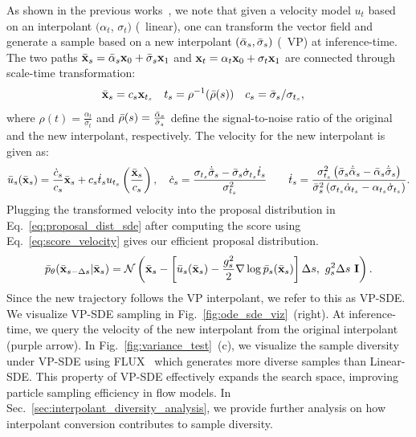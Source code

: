 As shown in the previous works~\cite{Lipman2024:flowguide, shaul2023bespoke}, we note that given a velocity model $u_t$ based on an interpolant $(\alpha_t$, $\sigma_t)$ (\eg~linear), one can transform the vector field and generate a sample based on a new interpolant $(\Bar{\alpha}_s, \Bar{\sigma}_s)$ (\eg~VP) at inference-time. 
The two paths $ \Bar{\mathbf{x}}_s = \Bar{\alpha}_s \mathbf{x}_0 + \Bar{\sigma}_s \mathbf{x}_1 $ and $ \mathbf{x}_t = \alpha_t \mathbf{x}_0 + \sigma_t \mathbf{x}_1 $ are connected through scale-time transformation:
\begin{align}
    \label{eq:scale_time_trans}
    \Bar{\mathbf{x}}_s &= c_s \mathbf{x}_{t_s} \quad t_s = \rho^{-1} (\Bar{\rho}(s)) \quad  c_s = \Bar{\sigma}_s / \sigma_{t_s},
\end{align}
where $\rho(t) = \frac{\alpha_t}{\sigma_t}$ and $\Bar{\rho}(s)=\frac{\Bar{\alpha}_s}{\Bar{\sigma}_s}$ define the signal-to-noise ratio of the original and the new interpolant, respectively. The velocity for the new interpolant is given as:
{\small
\begin{align}
    \label{eq:velocity_transform}
    \Bar{u}_s(\Bar{\mathbf{x}}_s) = \frac{\dot{c}_s}{c_s} \Bar{\mathbf{x}}_s & + c_s \dot{t}_s u_{t_s} \left(\frac{\Bar{\mathbf{x}}_{s}}{c_s} \right), \quad 
    \dot{c}_s = \frac{\sigma_{t_s} \dot{\Bar{\sigma}}_s - \Bar{\sigma}_s \dot{\sigma}_{t_s} \dot{t}_s}{\sigma_{t_s}^2} & 
    \quad \dot{t}_s = \frac{\sigma_{t_s}^2 \left( \Bar{\sigma}_s \dot{\Bar{\alpha}}_s - \Bar{\alpha}_s \dot{\Bar{\sigma}}_s \right)}{\Bar{\sigma}_s^2 \left( \sigma_{t_s} \dot{\alpha}_{t_s} - \alpha_{t_s} \dot{\sigma}_{t_s} \right)}.
\end{align}
}%
Plugging the transformed velocity into the proposal distribution in Eq.~\ref{eq:proposal_dist_sde} after computing the score using Eq.~\ref{eq:score_velocity} gives our efficient proposal distribution.
\begin{align}
    \label{eq:vp_sde_proposal}
    \Bar{p}_\theta(\Bar{\B{x}}_{s-\Delta s} | \Bar{\B{x}}_s) = \mathcal{N}\left(\Bar{\B{x}}_s - \left[ \Bar{u}_s(\Bar{\B{x}}_s) - \frac{g_s^2}{2} \nabla \log \Bar{p}_s(\Bar{\B{x}}_s) \right] \Delta s,\ 
     g_s^2 \Delta s\ \mathbf{I}\right).
\end{align}
Since the new trajectory follows the VP interpolant, we refer to this as VP-SDE. 
We visualize VP-SDE sampling in Fig.~\ref{fig:ode_sde_viz}~(right). At inference-time, we query the velocity of the new interpolant from the original interpolant (purple arrow). 
In Fig.~\ref{fig:variance_test}~(c), we visualize the sample diversity under VP-SDE using FLUX~\cite{BlackForestLabs:2024Flux} which generates more diverse samples than Linear-SDE. 
This property of VP-SDE effectively expands the search space, improving particle sampling efficiency in flow models. 
In Sec.~\ref{sec:interpolant_diversity_analysis}, we provide further analysis on how interpolant conversion contributes to sample diversity. 


